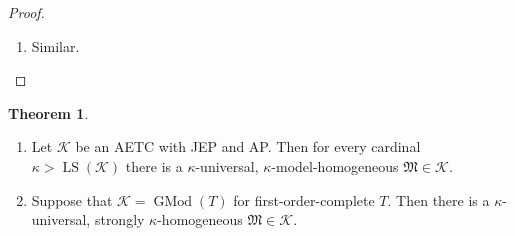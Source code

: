 \documentclass[a4paper]{amsart}
\theoremstyle{definition}
\newtheorem{theorem}[definition]{Theorem}
\theoremstyle{remark}
\newcommand{\M}{\mathcal{M}}
\newcommand{\K}{\mathcal{K}}
\DeclareMathOperator{\LS}{LS}
\theoremstyle{definition}
\renewcommand{\M}{\mathfrak{M}}
\DeclareMathOperator{\GMod}{GMod}
\begin{document}
\begin{proof}
\begin{enumerate}
        \item Similar. \qedhere
    \end{enumerate}
\end{proof}



\begin{theorem}\quad
    \begin{enumerate}
        \item Let $\K$ be an AETC with JEP and AP. Then for every cardinal $\kappa>\LS(\K)$ there is a $\kappa$-universal, $\kappa$-model-homogeneous $\M\in\K$.
        \item Suppose that $\K=\GMod(T)$ for first-order-complete $T$. Then there is a $\kappa$-universal, strongly $\kappa$-homogeneous $\M\in\K$.
    \end{enumerate}
\end{theorem}
\end{document}
